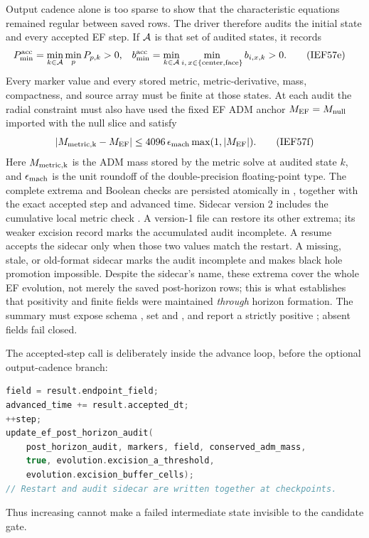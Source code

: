 Output cadence alone is too sparse to show that the characteristic equations
remained regular between saved rows.  The driver therefore audits the initial
state and every accepted EF step.  If \({\cal A}\) is that set of audited
states, it records
\begin{align}
 P_{\min}^{\rm acc}
  &=\min_{k\in{\cal A}}\min_p P_{p,k}>0,&
 b_{\min}^{\rm acc}
  &=\min_{k\in{\cal A}}\min_{i,\,x\in\{\mathrm{center},\mathrm{face}\}}
       b_{i,x,k}>0.                                    \tag{IEF57e}
\end{align}
Every marker value and every stored metric, metric-derivative, mass,
compactness, and source array must be finite at those states.  At each audit
the radial constraint must also have used the fixed EF ADM anchor
\(M_{\rm EF}=M_{\rm null}\) imported with the null slice and satisfy
\[
|M_{\rm metric,k}-M_{\rm EF}|
 \le4096\,\epsilon_{\rm mach}\max(1,|M_{\rm EF}|).    \tag{IEF57f}
\]
Here \(M_{\rm metric,k}\) is the ADM mass stored by the metric solve at
audited state \(k\), and \(\epsilon_{\rm mach}\) is the unit roundoff of the
double-precision floating-point type.
The complete extrema and Boolean checks are persisted atomically in
, together with the exact accepted step and
advanced time.  Sidecar version 2 includes the cumulative local metric check
.  A version-1 file can restore its
other extrema; its weaker excision record marks the accumulated audit
incomplete.  A resume accepts the sidecar only when those two values match
the restart.  A missing, stale, or old-format sidecar marks the audit
incomplete and makes black hole promotion impossible.  Despite the sidecar's
name, these extrema cover the whole EF evolution, not merely the saved
post-horizon rows; this is what establishes that positivity and finite fields
were maintained \emph{through} horizon formation.
The summary must expose schema
, set
 and , and report
a strictly positive ; absent fields fail
closed.

The accepted-step call is deliberately inside the advance loop, before the
optional output-cadence branch:
\begin{lstlisting}[language=C++,basicstyle=\ttfamily\scriptsize]
field = result.endpoint_field;
advanced_time += result.accepted_dt;
++step;
update_ef_post_horizon_audit(
    post_horizon_audit, markers, field, conserved_adm_mass,
    true, evolution.excision_a_threshold,
    evolution.excision_buffer_cells);
// Restart and audit sidecar are written together at checkpoints.
\end{lstlisting}
Thus increasing  cannot make a failed intermediate
state invisible to the candidate gate.

